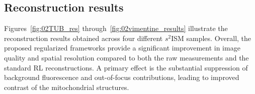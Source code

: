 \documentclass[letterpaper]{article}
\begin{document}


\subsection{Reconstruction results}

Figures~\ref{fig:02TUB_res} through~\ref{fig:02vimentine_results} illustrate the reconstruction results obtained across four different $s^2$ISM samples. Overall, the proposed regularized frameworks provide a significant improvement in image quality and spatial resolution compared to both the raw measurements and the standard RL reconstructions. A primary effect is the substantial suppression of background fluorescence and out-of-focus contributions, leading to improved contrast of the mitochondrial structures.
\end{document}
